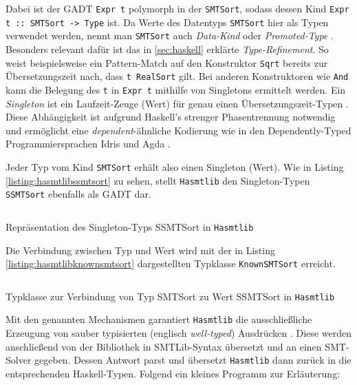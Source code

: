 Dabei ist der GADT \texttt{Expr t} polymorph in der \texttt{SMTSort}, sodass dessen Kind \texttt{Expr t :: SMTSort -> Type} ist.
Da Werte des Datentyps \texttt{SMTSort} hier als Typen verwendet werden, nennt man \texttt{SMTSort} auch \textit{Data-Kind} oder \textit{Promoted-Type} \cite{singletons}.
Besonders relevant dafür ist das in \ref{sec:haskell} erklärte \textit{Type-Refinement}.
So weist beispielsweise ein Pattern-Match auf den Konstruktor \texttt{Sqrt} bereits zur Übersetzungszeit nach, dass \texttt{t \raisebox{-0.6ex}{\textasciitilde} RealSort} gilt.
Bei anderen Konstruktoren wie \texttt{And} kann die Belegung des \texttt{t} in \texttt{Expr t} mithilfe von Singletons ermittelt werden.
Ein \textit{Singleton} ist ein Laufzeit-Zeuge (Wert) für genau einen Übersetzungszeit-Typen \cite{singletons}.
Diese Abhängigkeit ist aufgrund Haskell's strenger Phasentrennung notwendig und ermöglicht eine \textit{dependent}-ähnliche Kodierung
wie in den Dependently-Typed Programmiersprachen Idris \cite{idris} und Agda \cite{agda}.

Jeder Typ vom Kind \texttt{SMTSort} erhält also einen Singleton (Wert).
Wie in Listing \ref{listing:hasmtlibssmtsort} zu sehen, stellt \texttt{Hasmtlib} den Singleton-Typen \texttt{SSMTSort} ebenfalls als GADT dar.

\begin{listing}[H]
    \inputminted[linenos=true]{haskell}{Code/Implementierung/Hasmtlib/SSMTSort.hs}
    \caption{Repräsentation des Singleton-Typs SSMTSort in \texttt{Hasmtlib} \cite{hasmtlibSSMTSort}}
    \label{listing:hasmtlibssmtsort}
\end{listing}

Die Verbindung zwischen Typ und Wert wird mit der in Listing \ref{listing:hasmtlibknownsmtsort} dargestellten Typklasse \texttt{KnownSMTSort} erreicht.

\begin{listing}[H]
    \inputminted[linenos=true]{haskell}{Code/Implementierung/Hasmtlib/KnownSMTSort.hs}
    \caption{Typklasse zur Verbindung von Typ SMTSort zu Wert SSMTSort in \texttt{Hasmtlib} \cite{hasmtlibSSMTSort}}
    \label{listing:hasmtlibknownsmtsort}
\end{listing}

Mit den genannten Mechanismen garantiert \texttt{Hasmtlib} die ausschließliche Erzeugung von sauber typisierten (englisch \textit{well-typed}) Ausdrücken \cite{gadts}.
Diese werden anschließend von der Bibliothek in SMTLib-Syntax übersetzt und an einen SMT-Solver gegeben.
Dessen Antwort parst und übersetzt \texttt{Hasmtlib} dann zurück in die entsprechenden Haskell-Typen.
Folgend ein kleines Programm zur Erläuterung:

